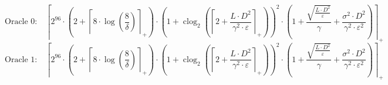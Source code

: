 \[\text{Oracle 0:}\quad \left\lceil 2^{96} \cdot \left(2 + \left\lceil 8 \cdot \log\left(\frac{8}{\delta}\right) \right\rceil_{+}\right) \cdot \left(1 + \operatorname{clog}_{2}\left(\left\lceil 2 + \frac{L \cdot D^{2}}{\gamma^{2} \cdot \varepsilon} \right\rceil_{+}\right)\right)^{2} \cdot \left(1 + \frac{\sqrt{\frac{L \cdot D^{2}}{\varepsilon}}}{\gamma} + \frac{\sigma^{2} \cdot D^{2}}{\gamma^{2} \cdot \varepsilon^{2}}\right) \right\rceil_{+}\]
\[\text{Oracle 1:}\quad \left\lceil 2^{96} \cdot \left(2 + \left\lceil 8 \cdot \log\left(\frac{8}{\delta}\right) \right\rceil_{+}\right) \cdot \left(1 + \operatorname{clog}_{2}\left(\left\lceil 2 + \frac{L \cdot D^{2}}{\gamma^{2} \cdot \varepsilon} \right\rceil_{+}\right)\right)^{2} \cdot \left(1 + \frac{\sqrt{\frac{L \cdot D^{2}}{\varepsilon}}}{\gamma} + \frac{\sigma^{2} \cdot D^{2}}{\gamma^{2} \cdot \varepsilon^{2}}\right) \right\rceil_{+}\]
